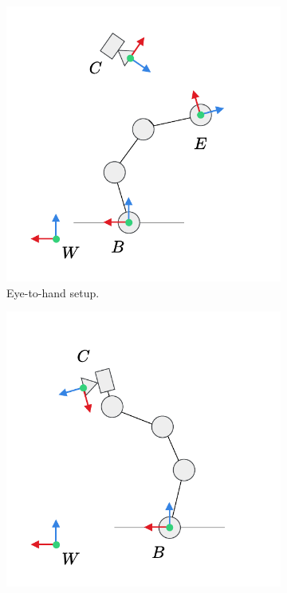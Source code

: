 \begin{figure}[tb]
    \centering
    \begin{subfigure}[b]{0.49\textwidth}
        \centering
        \includegraphics[width=\textwidth]{introduction/fig/eye_to_hand.pdf}
        \caption{Eye-to-hand setup.}
        \label{in:fig:eye_to_hand}
    \end{subfigure}
    \begin{subfigure}[b]{0.49\textwidth}
        \centering
        \includegraphics[width=\textwidth]{introduction/fig/eye_in_hand.pdf}

\end{subfigure}
\end{figure}
